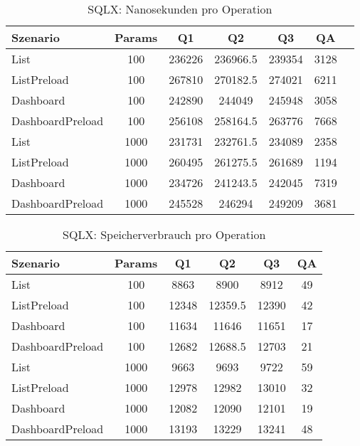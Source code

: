 
\begin{table}[ht]
\centering
\caption{SQLX: Nanosekunden pro Operation}
\begin{tabular}{lcccccc}
\toprule
Szenario & Params & Q1 & Q2 & Q3 & QA \\
\midrule
	List & 100 & 236226 & 236966.5 & 239354 & 3128 \\
	ListPreload & 100 & 267810 & 270182.5 & 274021 & 6211 \\
	Dashboard & 100 & 242890 & 244049 & 245948 & 3058 \\
	DashboardPreload & 100 & 256108 & 258164.5 & 263776 & 7668 \\
	List & 1000 & 231731 & 232761.5 & 234089 & 2358 \\
	ListPreload & 1000 & 260495 & 261275.5 & 261689 & 1194 \\
	Dashboard & 1000 & 234726 & 241243.5 & 242045 & 7319 \\
	DashboardPreload & 1000 & 245528 & 246294 & 249209 & 3681 \\
\bottomrule
\end{tabular}
\label{tab:benchmark_sqlx_nsperop}
\end{table}
	
\begin{table}[ht]
\centering
\caption{SQLX: Speicherverbrauch pro Operation}
\begin{tabular}{lccccc}
\toprule
Szenario & Params & Q1 & Q2 & Q3 & QA \\
\midrule
	List & 100 & 8863 & 8900 & 8912 & 49 \\
	ListPreload & 100 & 12348 & 12359.5 & 12390 & 42 \\
	Dashboard & 100 & 11634 & 11646 & 11651 & 17 \\
	DashboardPreload & 100 & 12682 & 12688.5 & 12703 & 21 \\
	List & 1000 & 9663 & 9693 & 9722 & 59 \\
	ListPreload & 1000 & 12978 & 12982 & 13010 & 32 \\
	Dashboard & 1000 & 12082 & 12090 & 12101 & 19 \\
	DashboardPreload & 1000 & 13193 & 13229 & 13241 & 48 \\
\bottomrule
\end{tabular}
\label{tab:benchmark_sqlx_bytesperop}
\end{table}
	
